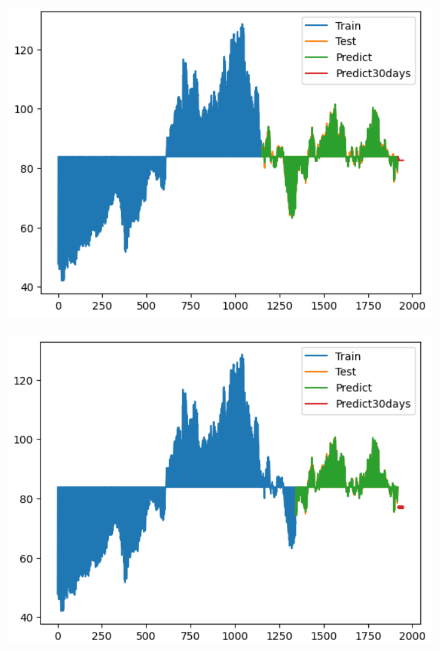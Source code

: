 \documentclass{article}
\begin{document}
\begin{multicols}{2}
\begin{figure}[H]
    \centering
    \begin{minipage}{0.15\textwidth}
    \centering
    \includegraphics[width=1\textwidth]{Image/XGBoost/SONY_6_4_30.png}
   
    \label{fig:1}
    \end{minipage}%
    \begin{minipage}{0.15\textwidth}
    \centering
    \includegraphics[width=1\textwidth]{Image/XGBoost/SONY_7_3_30.png}
  

\end{minipage}
\end{figure}
\end{multicols}
\end{document}
